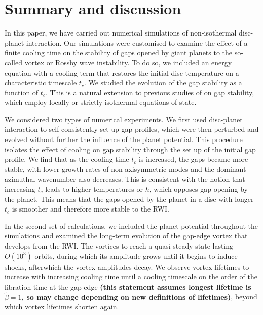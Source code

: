 \section{Summary and discussion}\label{summary}
In this paper, we have carried out numerical simulations of non-isothermal disc-planet interaction. 
Our simulations were customised to examine the effect of a finite cooling time on the stability of gaps 
opened by giant planets to the so-called vortex or Rossby wave instability. To do so, we 
included an energy equation with a cooling term that restores the initial disc temperature on a characteristic timescale $t_c$. 
We studied the evolution of the gap stability as a function of $t_c$. This is a natural extension to previous
studies of on gap stability, which employ locally or strictly isothermal equations of state. 	

We considered two types of numerical experiments. 
We first used disc-planet interaction to self-consistently set up
gap profiles, which were then perturbed and evolved without further the influence of the planet potential. This procedure  
isolates the effect of cooling on gap stability through the set up of the initial gap profile. We find that as the cooling time $t_c$ is increased,
the gaps became more stable, with lower growth rates of non-axisymmetric modes and the dominant azimuthal wavenumber also decreases. 
This is consistent with the notion that increasing $t_c$ leads to higher temperatures or $h$, which opposes gap-opening by the planet. This means that
the gaps opened by the planet in a disc with longer $t_c$ is smoother and therefore  more stable to the RWI. 


In the second set of calculations, we included the planet potential throughout the simulations 
and examined the long-term evolution of the gap-edge vortex that develops from the RWI. The vortices to reach a
quasi-steady state lasting $O(10^3)$ orbits, during which its amplitude grows until it begins to induce shocks,  
afterwhich the vortex amplitudes decay. 
We observe vortex lifetimes to increase with increasing cooling time until
a cooling timescale on the order of the libration time at the gap edge {\bf (this statement assumes longest lifetime is $\tilde{\beta}=1$, so may change
depending on new definitions of lifetimes)}, beyond which vortex lifetimes shorten again. 

